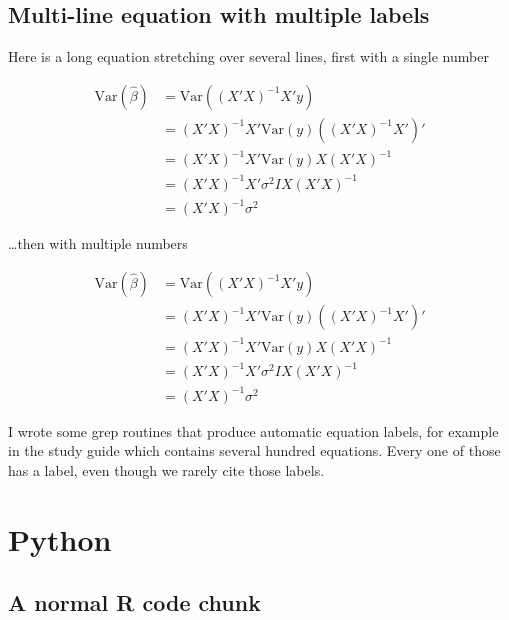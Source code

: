 \documentclass[]{book}
\begin{document}
\hypertarget{multi-line-equation-with-multiple-labels}{%
\section{Multi-line equation with multiple labels}\label{multi-line-equation-with-multiple-labels}}

Here is a long equation stretching over several lines, first with a single number

\begin{equation} 
\begin{split}
\mathrm{Var}(\hat{\beta}) & =\mathrm{Var}((X'X)^{-1}X'y)\\
 & =(X'X)^{-1}X'\mathrm{Var}(y)((X'X)^{-1}X')'\\
 & =(X'X)^{-1}X'\mathrm{Var}(y)X(X'X)^{-1}\\
 & =(X'X)^{-1}X'\sigma^{2}IX(X'X)^{-1}\\
 & =(X'X)^{-1}\sigma^{2}
\end{split}
\label{eq:var-beta1}
\end{equation}

\ldots{}then with multiple numbers

\begin{align}
\mathrm{Var}(\hat{\beta}) & =\mathrm{Var}((X'X)^{-1}X'y) \nonumber \\
 & =(X'X)^{-1}X'\mathrm{Var}(y)((X'X)^{-1}X')'\label{eq:var-a}\\ 
 & =(X'X)^{-1}X'\mathrm{Var}(y)X(X'X)^{-1}\label{eq:var-b}\\ 
 & =(X'X)^{-1}X'\sigma^{2}IX(X'X)^{-1}\label{eq:var-c}\\ 
 & =(X'X)^{-1}\sigma^{2} \label{eq:var-d}
\end{align}

I wrote some grep routines that produce automatic equation labels, for example in the study guide which contains several hundred equations. Every one of those has a label, even though we rarely cite those labels.

\hypertarget{python}{%
\chapter{Python}\label{python}}

\hypertarget{a-normal-r-code-chunk}{%
\section{A normal R code chunk}\label{a-normal-r-code-chunk}}
\end{document}

